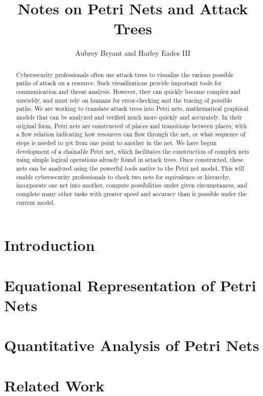 \documentclass{article}
\title{Notes on Petri Nets and Attack Trees}
\author{Aubrey Bryant and Harley Eades III}
\begin{document}
\maketitle 

\begin{abstract}
  Cybersecurity professionals often use attack trees to visualize the various possible paths of attack on a resource. Such visualizations provide important tools for communication and threat analysis. However, they can quickly become complex and unwieldy, and must rely on humans for error-checking and the tracing of possible paths. We are working to translate attack trees into Petri nets, mathematical graphical models that can be analyzed and verified much more quickly and accurately. In their original form, Petri nets are constructed of places and transitions between places, with a flow relation indicating how resources can flow through the net, or what sequence of steps is needed to get from one point to another in the net. We have begun development of a chainable Petri net, which facilitates the construction of complex nets using simple logical operations already found in attack trees. Once constructed, these nets can be analyzed using the powerful tools native to the Petri net model. This will enable cybersecurity professionals to check two nets for equivalence or hierarchy, incorporate one net into another, compute possibilities under given circumstances, and complete many other tasks with greater speed and accuracy than is possible under the current model.
\end{abstract}
\section{Introduction}


\section{Equational Representation of Petri Nets}

\section{Quantitative Analysis of Petri Nets}

\section{Related Work}

\nocite{*}


\end{document}
